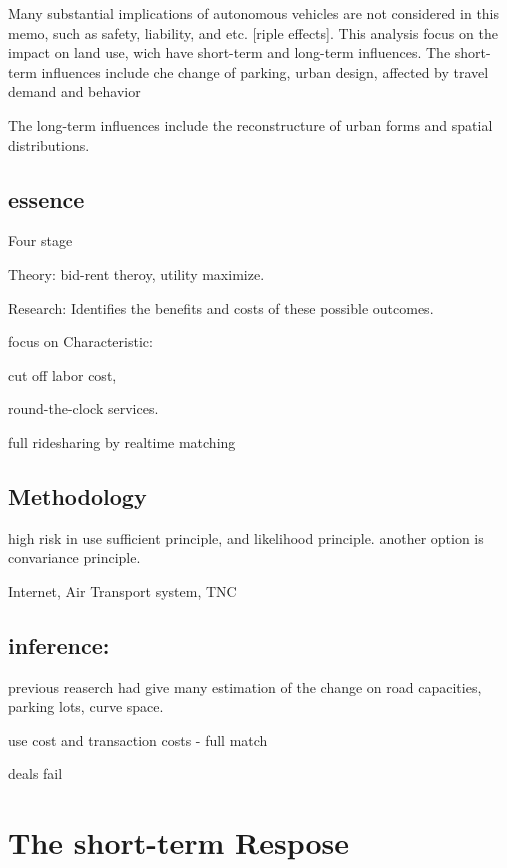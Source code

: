 \documentclass[12pt,]{article}
\begin{document}
Many substantial implications of autonomous vehicles are not considered
in this memo, such as safety, liability, and etc. {[}riple effects{]}.
This analysis focus on the impact on land use, wich have short-term and
long-term influences. The short-term influences include che change of
parking, urban design, affected by travel demand and behavior

The long-term influences include the reconstructure of urban forms and
spatial distributions.

\hypertarget{essence}{%
\subsection{essence}\label{essence}}

Four stage

Theory: bid-rent theroy, utility maximize.

Research: Identifies the benefits and costs of these possible outcomes.

focus on Characteristic:

cut off labor cost,

round-the-clock services.

full ridesharing by realtime matching

\hypertarget{methodology}{%
\subsection{Methodology}\label{methodology}}

high risk in use sufficient principle, and likelihood principle. another
option is convariance principle.

Internet, Air Transport system, TNC

\hypertarget{inference}{%
\subsection{inference:}\label{inference}}

previous reaserch had give many estimation of the change on road
capacities, parking lots, curve space.

use cost and transaction costs - full match

deals fail

\hypertarget{the-short-term-respose}{%
\section{The short-term Respose}\label{the-short-term-respose}}
\end{document}
